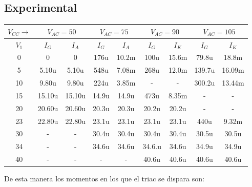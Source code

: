 \subsection{Experimental}
\begin{table}[H]
  \begin{center}
    \begin{tabular}{|c|c|c|c|c|c|c|c|c|}
      \hline
      $V_{CC}\rightarrow $&\multicolumn{2}{|c|}{$V_{AC}=50$} &\multicolumn{2}{c|}{$V_{AC}=75$} &\multicolumn{2}{c|}{$V_{AC}=90$} &\multicolumn{2}{c|}{$V_{AC}=105$}\\ 
      \hline
      \hline
      $V_{1}$ &$I_G$ &$I_A$  &$I_G$ &$I_A$  &$I_G$ &$I_K$  &$I_G$ &$I_K$\\ 
      \hline
      0    &0      &0        &176u    &10.2m   &100u   &15.6m &79.8u    &18.8m    \\
      5    &5.10u  &5.10u    &548u    &7.08m   &268u   &12.0m &139.7u   &16.09m   \\
      10   &9.80u  &9.80u    &224u    &3.85m   &-      &-     &300.2u   &13.44m   \\
      15   &15.10u &15.10u   &14.9u   &14.9u   &473u   &8.35m &-        &-        \\
      20   &20.60u &20.60u   &20.3u   &20.3u   &20.2u  &20.2u &-        &-        \\
      23   &22.80u &22.80u   &23.1u   &23.1u   &23.1u  &23.1u &440u     &9.32m    \\
      30   &-      &-        &30.4u   &30.4u   &30.4u  &30.4u &30.5u    &30.5u    \\
      34   &-      &-        &34.6u   &34.6u   &34.6.u &34.6u &34.9u    &34.9u    \\
      40   &-      &-        &-       &-       &40.6u  &40.6u &40.6u    &40.6u    \\
            \hline
    \end{tabular}
  \end{center}
\end{table}
De esta manera los momentos en los que el triac se dispara son:
